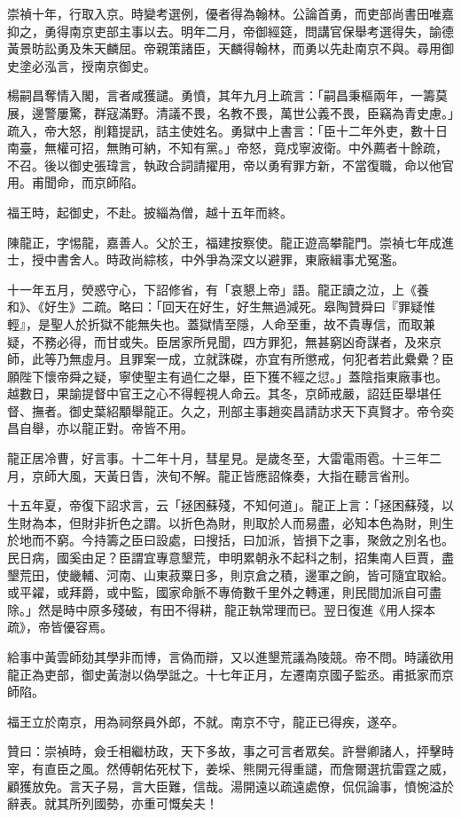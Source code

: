 \begin{pinyinscope}
崇禎十年，行取入京。時變考選例，優者得為翰林。公論首勇，而吏部尚書田唯嘉抑之，勇得南京吏部主事以去。明年二月，帝御經筵，問講官保舉考選得失，諭德黃景昉訟勇及朱天麟屈。帝親策諸臣，天麟得翰林，而勇以先赴南京不與。尋用御史塗必泓言，授南京御史。

楊嗣昌奪情入閣，言者咸獲譴。勇憤，其年九月上疏言：「嗣昌秉樞兩年，一籌莫展，邊警屢驚，群寇滿野。清議不畏，名教不畏，萬世公義不畏，臣竊為青史慮。」疏入，帝大怒，削籍提訊，詰主使姓名。勇獄中上書言：「臣十二年外吏，數十日南臺，無權可招，無賄可納，不知有黨。」帝怒，竟戍寧波衛。中外薦者十餘疏，不召。後以御史張瑋言，執政合詞請擢用，帝以勇宥罪方新，不當復職，命以他官用。甫聞命，而京師陷。

福王時，起御史，不赴。披緇為僧，越十五年而終。

陳龍正，字惕龍，嘉善人。父於王，福建按察使。龍正遊高攀龍門。崇禎七年成進士，授中書舍人。時政尚綜核，中外爭為深文以避罪，東廠緝事尤冤濫。

十一年五月，熒惑守心，下詔修省，有「哀懇上帝」語。龍正讀之泣，上《養和》、《好生》二疏。略曰：「回天在好生，好生無過減死。皋陶贊舜曰『罪疑惟輕』，是聖人於折獄不能無失也。蓋獄情至隱，人命至重，故不貴專信，而取兼疑，不務必得，而甘或失。臣居家所見聞，四方罪犯，無甚窮凶奇謀者，及來京師，此等乃無虛月。且罪案一成，立就誅磔，亦宜有所懲戒，何犯者若此纍纍？臣願陛下懷帝舜之疑，寧使聖主有過仁之舉，臣下獲不經之愆。」蓋陰指東廠事也。越數日，果諭提督中官王之心不得輕視人命云。其冬，京師戒嚴，詔廷臣舉堪任督、撫者。御史葉紹顒舉龍正。久之，刑部主事趙奕昌請訪求天下真賢才。帝令奕昌自舉，亦以龍正對。帝皆不用。

龍正居冷曹，好言事。十二年十月，彗星見。是歲冬至，大雷電雨雹。十三年二月，京師大風，天黃日眚，浹旬不解。龍正皆應詔條奏，大指在聽言省刑。

十五年夏，帝復下詔求言，云「拯困蘇殘，不知何道」。龍正上言：「拯困蘇殘，以生財為本，但財非折色之謂。以折色為財，則取於人而易盡，必知本色為財，則生於地而不窮。今持籌之臣曰設處，曰搜括，曰加派，皆損下之事，聚斂之別名也。民日病，國奚由足？臣謂宜專意墾荒，申明累朝永不起科之制，招集南人巨賈，盡墾荒田，使畿輔、河南、山東菽粟日多，則京倉之積，邊軍之餉，皆可隨宜取給。或平糴，或拜爵，或中監，國家命脈不專倚數千里外之轉運，則民間加派自可盡除。」然是時中原多殘破，有田不得耕，龍正執常理而已。翌日復進《用人探本疏》，帝皆優容焉。

給事中黃雲師劾其學非而博，言偽而辯，又以進墾荒議為陵競。帝不問。時議欲用龍正為吏部，御史黃澍以偽學詆之。十七年正月，左遷南京國子監丞。甫抵家而京師陷。

福王立於南京，用為祠祭員外郎，不就。南京不守，龍正已得疾，遂卒。

贊曰：崇禎時，僉壬相繼枋政，天下多故，事之可言者眾矣。許譽卿諸人，抨擊時宰，有直臣之風。然傅朝佑死杖下，姜埰、熊開元得重譴，而詹爾選抗雷霆之威，顧獲放免。言天子易，言大臣難，信哉。湯開遠以疏遠處僚，侃侃論事，憤惋溢於辭表。就其所列國勢，亦重可慨矣夫！


\end{pinyinscope}